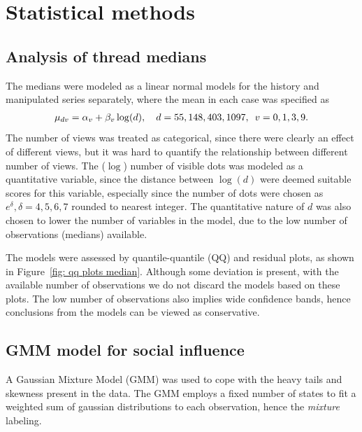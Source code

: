 \documentclass[9pt,a4paper,twocolumn,lineno]{article}
\begin{document}
\section*{Statistical methods}
\subsection*{Analysis of thread medians}
The medians were modeled as a linear normal models for the history and manipulated series separately, where the mean in each case was specified as
\begin{align*}
	\mu_{dv} = \alpha_v+\beta_v\log(d), \quad d=55, 148, 403, 1097, \enskip v=0,1,3,9 .
\end{align*}
The number of views was treated as categorical, since there were clearly an effect of different views, but it was hard to quantify the relationship between different number of views. The ($\log$) number of visible dots was modeled as a quantitative variable, since the distance between $\log(d)$ were deemed suitable scores for this variable, especially since the number of dots were chosen as $e^{\delta}, \delta=4,5,6,7$ rounded to nearest integer. The quantitative nature of $d$ was also chosen to lower the number of variables in the model, due to the low number of observations (medians) available. 

The models were assessed by quantile-quantile (QQ) and residual plots, as shown in Figure~\ref{fig: qq plots median}. Although some deviation is present, with the available number of observations we do not discard the models based on these plots. The low number of observations also implies wide confidence bands, hence conclusions from the models can be viewed as conservative. 

\subsection*{GMM model for social influence}
A Gaussian Mixture Model (GMM) was used to cope with the heavy tails and skewness present in the data. The GMM employs a fixed number of states to fit a weighted sum of gaussian distributions to each observation, hence the \emph{mixture} labeling.
\end{document}
